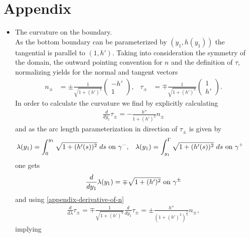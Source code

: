 \documentclass{article}
\theoremstyle{definition}
\theoremstyle{definition}
\begin{document}
\section{Appendix}
\begin{itemize}
    \item The curvature on the boundary.\\
        As the bottom boundary can be parameterized by $(y_1,h(y_1))$ the tangential is parallel to $(1,h')$. Taking into consideration the symmetry of the domain, the outward pointing convention for $n$ and the definition of $\tau$, normalizing yields for the normal and tangent vectors
        \begin{align}
            \label{appendix-normal-vector-representation}
            n_\pm &= \pm \frac{1}{\sqrt{1+(h')^2}}\begin{pmatrix}-h'\\1\end{pmatrix},& \tau_\pm &= \mp \frac{1}{\sqrt{1+(h')^2}}\begin{pmatrix}1\\h'\end{pmatrix}.
        \end{align}
        In order to calculate the curvature we find by explicitly calculating
        \begin{align}
            \label{appendix-derivative-of-n}
            \frac{d}{dy_1} \tau_\pm = -\frac{h''}{1+(h')^2} n_\pm
        \end{align}
        and as the arc length parameterization in direction of $\tau_\pm$ is given by
        \begin{align*}
            \lambda(y_1) &= \int_{0}^{y_1} \sqrt{1+(h'(s))^2} \ ds \textnormal{ on }\gamma^-,
            & \lambda(y_1) &= \int_{y_1}^{\Gamma} \sqrt{1+(h'(s))^2} \ ds \textnormal{ on }\gamma^+
        \end{align*}
        one gets
        \begin{align*}
            \frac{d}{d y_1}\lambda(y_1) = \mp \sqrt{1+(h')^2} \textnormal{ on }\gamma^\pm
        \end{align*}
        and using \eqref{appendix-derivative-of-n}
        \begin{align*}
            \frac{d}{d\lambda} \tau_\pm = \mp \frac{1}{\sqrt{1+(h')^2}} \frac{d}{dy_1} \tau_\pm = \pm \frac{h''}{(1+(h')^2)^\frac{3}{2}} n_\pm,
        \end{align*}
        implying
        \begin{align}
            \label{appendix-kappa-representation}

\end{align}
\end{itemize}
\end{document}
